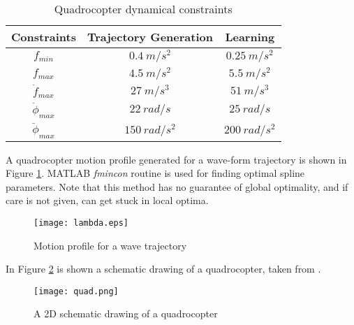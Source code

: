 {\color{red}
\begin{table}[h!t]
\renewcommand{\arraystretch}{1.3}
\caption{Quadrocopter dynamical constraints}
\label{table_parameters}
\centering
\begin{tabular}{ccc}
\textbf{Constraints} & \textbf{Trajectory Generation} & \textbf{Learning} \\
\hline
$f_{min}$ & $0.4\ m/s^2$ & $0.25\ m/s^2$ \\
$f_{max}$ & $4.5\ m/s^2$ & $5.5\ m/s^2$ \\
$\dot{f}_{max}$ & $27\ m/s^3$ & $51\ m/s^3$ \\
$\dot{\phi}_{max}$ & $22\ rad/s$ & $25\ rad/s$ \\
$\ddot{\phi}_{max}$ & $150\ rad/s^2$ & $200\ rad/s^2$ \\
\end{tabular}
\end{table}
}

A quadrocopter motion profile generated for a wave-form trajectory is shown in Figure \ref{Lambda profile}. MATLAB \emph{fmincon} routine is used for finding optimal spline parameters. Note that this method has no guarantee of global optimality, and if care is not given, can get stuck in local optima.

\begin{figure}
\center
\texttt{[image: lambda.eps]}
\caption{Motion profile for a wave trajectory}
\label{Lambda profile}
\end{figure}

In Figure \ref{Quadrocopter} is shown a schematic drawing of a quadrocopter, taken from \cite{ILC_Angela}.

\begin{figure}
\center		
\texttt{[image: quad.png]}
\caption{A 2D schematic drawing of a quadrocopter}
\label{Quadrocopter}
\end{figure}
